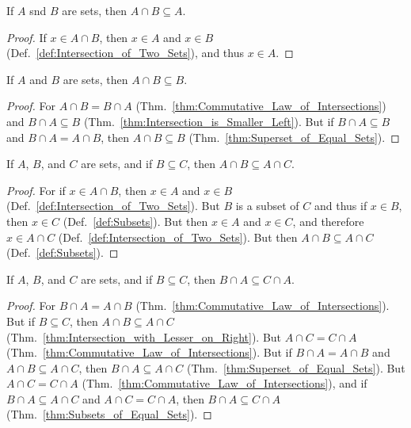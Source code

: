         \begin{theorem}
            \label{thm:Intersection_is_Smaller_Left}%
            If $A$ snd $B$ are sets, then $A\cap{B}\subseteq{A}$.
        \end{theorem}
        \begin{proof}
            If $x\in{A}\cap{B}$, then $x\in{A}$ and $x\in{B}$
            (Def.~\ref{def:Intersection_of_Two_Sets}), and thus $x\in{A}$.
        \end{proof}
        \begin{theorem}
            \label{thm:Intersection_is_Smaller_Right}%
            If $A$ and $B$ are sets, then $A\cap{B}\subseteq{B}$.
        \end{theorem}
        \begin{proof}
            For $A\cap{B}=B\cap{A}$
            (Thm.~\ref{thm:Commutative_Law_of_Intersections}) and
            $B\cap{A}\subseteq{B}$
            (Thm.~\ref{thm:Intersection_is_Smaller_Left}). But if
            $B\cap{A}\subseteq{B}$ and $B\cap{A}=A\cap{B}$, then
            $A\cap{B}\subseteq{B}$ (Thm.~\ref{thm:Superset_of_Equal_Sets}).
        \end{proof}
        \begin{theorem}
            \label{thm:Intersection_with_Lesser_on_Right}%
            If $A$, $B$, and $C$ are sets, and if $B\subseteq{C}$, then
            $A\cap{B}\subseteq{A}\cap{C}$.
        \end{theorem}
        \begin{proof}
            For if $x\in{A}\cap{B}$, then $x\in{A}$ and $x\in{B}$
            (Def.~\ref{def:Intersection_of_Two_Sets}). But $B$ is a subset of
            $C$ and thus if $x\in{B}$, then $x\in{C}$ (Def.~\ref{def:Subsets}).
            But then $x\in{A}$ and $x\in{C}$, and therefore $x\in{A}\cap{C}$
            (Def.~\ref{def:Intersection_of_Two_Sets}). But
            then $A\cap{B}\subseteq{A}\cap{C}$ (Def.~\ref{def:Subsets}).
        \end{proof}
        \begin{theorem}
            \label{thm:Intersection_with_Lesser_on_Left}%
            If $A$, $B$, and $C$ are sets, and if $B\subseteq{C}$, then
            $B\cap{A}\subseteq{C}\cap{A}$.
        \end{theorem}
        \begin{proof}
            For $B\cap{A}=A\cap{B}$
            (Thm.~\ref{thm:Commutative_Law_of_Intersections}). But if
            $B\subseteq{C}$, then $A\cap{B}\subseteq{A}\cap{C}$
            (Thm.~\ref{thm:Intersection_with_Lesser_on_Right}). But
            $A\cap{C}=C\cap{A}$
            (Thm.~\ref{thm:Commutative_Law_of_Intersections}). But if
            $B\cap{A}=A\cap{B}$ and $A\cap{B}\subseteq{A}\cap{C}$, then
            $B\cap{A}\subseteq{A}\cap{C}$
            (Thm.~\ref{thm:Superset_of_Equal_Sets}). But $A\cap{C}=C\cap{A}$
            (Thm.~\ref{thm:Commutative_Law_of_Intersections}), and if
            $B\cap{A}\subseteq{A}\cap{C}$ and $A\cap{C}=C\cap{A}$, then
            $B\cap{A}\subseteq{C}\cap{A}$
            (Thm.~\ref{thm:Subsets_of_Equal_Sets}).
        \end{proof}
